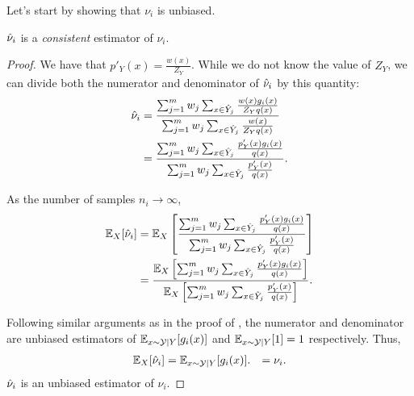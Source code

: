 Let's start by showing that $\nu_i$ is unbiased.
\begin{theorem}
\label{thm:nuh}
  ${\hat{\nu}}_i$ is a \textit{consistent} estimator of $\nu_i$.
\end{theorem}
\begin{proof}
  We have that $p'_Y(x) = \frac{w(x)}{Z_Y}$.
  While we do not know the value of $Z_Y$, we can divide both the numerator and denominator of ${\hat{\nu}}_i$ by this quantity:
  \begin{align*}
    {\hat{\nu}}_i 
    &= \frac{\sum_{j=1}^m w_j \sum_{x \in {\hat{Y}}_j} \frac{w(x) g_i(x)}{Z_Y q(x)}}{\sum_{j=1}^m w_j \sum_{x \in {\hat{Y}}_j} \frac{w(x)}{Z_Y q(x)}} \\
    &= \frac{\sum_{j=1}^m w_j \sum_{x \in {\hat{Y}}_j} \frac{p'_Y(x) g_i(x)}{q(x)}}{\sum_{j=1}^m w_j \sum_{x \in {\hat{Y}}_j} \frac{p'_Y(x)}{q(x)}}.
  \end{align*}

  As the number of samples $n_i \to \infty$,
  \begin{align*}
    \mathbb{E}_{X}[{\hat{\nu}}_i] 
    &= \mathbb{E}_{X}\left[ \frac{\sum_{j=1}^m w_j \sum_{x \in {\hat{Y}}_j} \frac{p'_Y(x) g_i(x)}{q(x)}}{\sum_{j=1}^m w_j \sum_{x \in {\hat{Y}}_j} \frac{p'_Y(x)}{q(x)}} \right] \\
    &= \frac{\mathbb{E}_{X}\left[ \sum_{j=1}^m w_j \sum_{x \in {\hat{Y}}_j} \frac{p'_Y(x) g_i(x)}{q(x)} \right]}
    {\mathbb{E}_{X}\left[\sum_{j=1}^m w_j \sum_{x \in {\hat{Y}}_j} \frac{p'_Y(x)}{q(x)}\right]}.
  \end{align*}

  Following similar arguments as in the proof of , the numerator and denominator are unbiased estimators of $\mathbb{E}_{x \sim \mathcal{Y} \mid Y}[g_i(x)]$ and $\mathbb{E}_{x \sim \mathcal{Y} \mid Y}[1] = 1$ respectively.
  Thus,
  \begin{align*}
    \mathbb{E}_{X}[{\hat{\nu}}_i] 
    &= \mathbb{E}_{x \sim \mathcal{Y} \mid Y}[g_i(x)].
    &= \nu_i.
  \end{align*}
  ${\hat{\nu}}_i$ is an unbiased estimator of $\nu_i$.

\end{proof}

